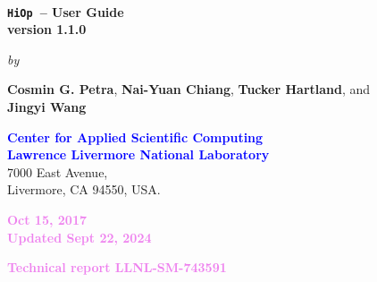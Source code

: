 \documentclass[11pt]{article}
\newcommand{\Hi}{\texttt{HiOp}\xspace}
\begin{document}

\begin{titlepage}



\begin{center}
\ 
\vspace{3cm}

  {\huge\bfseries \Hi\ -- User Guide} \\[14pt]
  {\large\bfseries version 1.1.0}

\vspace{3cm}

{\large\emph{by}}

\vspace{1.25cm}

 {\Large\bfseries Cosmin G. Petra}, {\Large\bfseries Nai-Yuan Chiang}, {\Large\bfseries Tucker Hartland}, and \\ {\Large\bfseries Jingyi Wang} \\ 
 
\vspace{1.1cm}

{\bfseries\Large{\textcolor{blue}{Center for Applied Scientific Computing\\
Lawrence Livermore National Laboratory}}}\\[10pt]


{\Large{7000 East Avenue, \\Livermore, CA 94550, USA.}}


\vspace{4.75cm}

 \textcolor{violet}{{\large\bfseries Oct 15, 2017} \\
{\large\bfseries Updated Sept 22, 2024}}

\vspace{0.75cm}

{\Large\bfseries \textcolor{violet}{Technical report LLNL-SM-743591}}





\end{center}
\end{titlepage}

\newpage

 \ 
 
\bigskip

\bigskip

\end{document}
